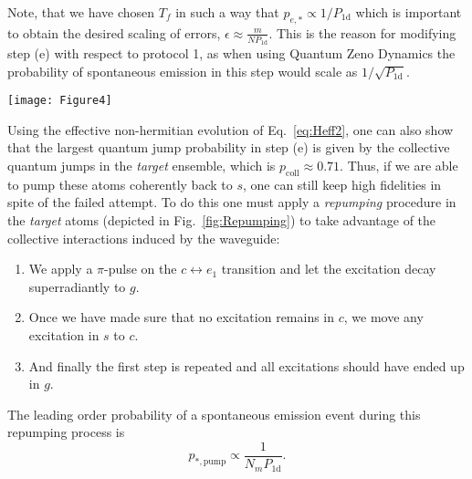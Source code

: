 \documentclass[twocolumn,pra,aps,superscriptaddress,showpacs]{revtex4-1}
\def\oned{\mathrm{1d}}
\begin{document}
Note, that we have chosen $T_f$ in such a way that $p_{e,*}\propto 1/P_\oned$ which is important to obtain the desired scaling of errors, $\epsilon \approx \frac{m}{N P_\oned}$. This is the reason for modifying step (e) with respect to protocol 1, as when using Quantum Zeno Dynamics the probability of spontaneous emission in this step would scale as $1/\sqrt{P_\oned}$.

\begin{figure*}[t]
	\centering
	\texttt{[image: Figure4]}
	\caption{
		(a) The repumping scheme contains three steps for pumping any excitation in the metastable states $c$ or $s$ back to the ground state $g$. (b) Schemes to build up $m$ excitations in a metastable state by beam splitter operations and postselection on zero detection in one of the modes. By doubling the number of excitations at each step one can achieve a subexponential scaling.}
	\label{fig:Repumping}
\end{figure*}

Using the effective non-hermitian evolution of Eq.~\ref{eq:Heff2}, one can also show that the largest quantum jump probability in step (e) is given by the collective quantum jumps in the \emph{target} ensemble, which is $p_{\mathrm{coll}}\approx 0.71$. Thus, if we are able to pump these atoms coherently back to $s$, one can still keep high fidelities in spite of the failed attempt. To do this one must apply a \emph{repumping} procedure in the \emph{target} atoms (depicted in Fig.~\ref{fig:Repumping}) to take advantage of the collective interactions induced by the waveguide:
\begin{enumerate}
	\item
	We apply a $\pi$-pulse on the $c \leftrightarrow e_1$ transition and let the excitation decay superradiantly to $g$.
	\item 
	Once we have made sure that no excitation remains in $c$, we move any excitation in $s$ to $c$.
	\item 
	And finally the first step is repeated and all excitations should have ended up in $g$.
\end{enumerate}

The leading order probability of a spontaneous emission event during this repumping process is
\begin{equation}
p_{*,\mathrm{pump}} \propto \frac{1}{N_m P_\oned}.
\end{equation}
\end{document}
